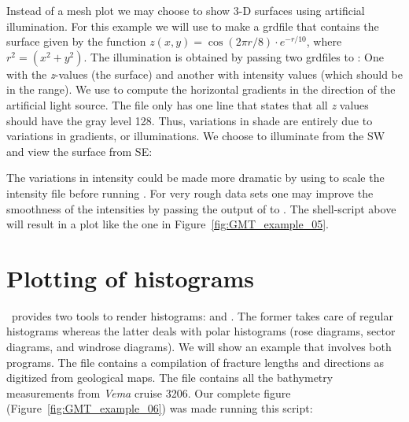 Instead of a mesh plot we may choose to show 3-D surfaces using
artificial illumination.  For this example we will use
 to make a grdfile that contains the surface given
by the function $z(x, y) = \cos (2\pi r/8)\cdot e^{-r/10}$, where
$r^2 = (x^2 + y^2)$.  The illumination is obtained by passing
two grdfiles to : One with the {\it z}-values
(the surface) and another with intensity values (which should
be in the  range).  We use  to compute
the horizontal gradients in the direction of the artificial
light source.  The  file only has one line that states
that all {\it z} values should have the gray level 128.  Thus,
variations in shade are entirely due to variations in gradients,
or illuminations.  We choose to illuminate from the SW and view
the surface from SE:


The variations in intensity could be made more dramatic by
using  to scale the intensity file before
running .  For very rough data sets one may
improve the smoothness of the intensities by passing the
output of  to .  The
shell-script above will result in a plot like the one in
Figure~\ref{fig:GMT_example_05}.



\section{Plotting of histograms}

\GMT\ provides two tools to render histograms: 
and .  The former takes care of regular histograms
whereas the latter deals with polar histograms (rose diagrams,
sector diagrams, and windrose diagrams).  We will show an
example that involves both programs.  The file 
contains a compilation of fracture lengths and directions as
digitized from geological maps.  The file  contains
all the bathymetry measurements from {\it Vema} cruise 3206.
Our complete figure (Figure~\ref{fig:GMT_example_06}) was made running
this script:



